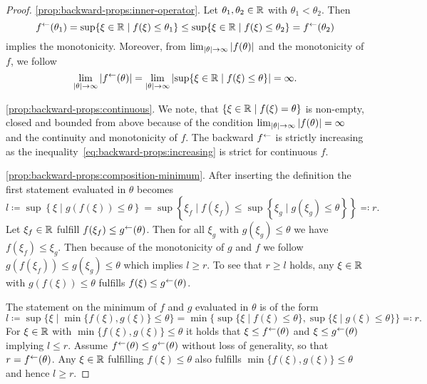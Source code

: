 \begin{proof}
    \ref{prop:backward-props:inner-operator}. 
    Let $\theta_1, \theta_2\in\mathbb{R}$ with $\theta_1 < \theta_2$.
    Then \begin{equation}\label{eq:backward-props:increasing}
        f^{\leftarrow}(\theta_1) = \sup\{\xi\in\mathbb{R} \mid f(\xi) \leq \theta_1 \}
        \leq \sup\{\xi\in\mathbb{R} \mid f(\xi)\leq \theta_2 \} = f^{\leftarrow}(\theta_2)
    \end{equation}
    implies the monotonicity.
    Moreover, from $\lim_{\left| \theta \right|\rightarrow \infty} \left| f(\theta) \right|$ and the monotonicity of $f$, we follow \[
        \lim_{\left| \theta \right|\rightarrow \infty} \left| f^{\leftarrow}(\theta) \right|
        = \lim_{\left| \theta \right|\rightarrow \infty} \left|  \sup\{\xi\in\mathbb{R} \mid f(\xi)\leq \theta \}  \right| = \infty.
    \]

    \ref{prop:backward-props:continuous}.
    We note, that $\{ \xi\in\mathbb{R} \mid f(\xi) = \theta \}$ is non-empty, closed and bounded from above because of the condition $\lim_{\left| \theta \right|\rightarrow \infty} \left| f(\theta) \right| = \infty$ and the continuity and monotonicity of $f$.
    The backward $f^{\leftarrow}$ is strictly increasing as the inequality~\eqref{eq:backward-props:increasing} is strict for continuous $f$.
    
    \ref{prop:backward-props:composition-minimum}.
    After inserting the definition the first statement evaluated in $\theta$ becomes
    \[
        l\coloneqq \sup\left\{
            \xi \mid g(f(\xi)) \leq \theta
        \right\}
        =
        \sup\left\{
            \xi_f \mid f(\xi_f) \leq
            \sup\left\{ \xi_g \mid g(\xi_g) \leq \theta \right\}
            \right\}
         \eqqcolon r.
    \]
    Let $\xi_f\in\mathbb{R}$ fulfill $f(\xi_f) \leq g^{\leftarrow}(\theta)$.
    Then for all $\xi_g$ with $g(\xi_g) \leq \theta$ we have $f(\xi_f) \leq \xi_g$.
    Then because of the monotonicity of $g$ and $f$ we follow $g(f(\xi_f)) \leq g(\xi_g) \leq \theta$ which implies $l \geq r$.
    To see that $r\geq l$ holds, any $\xi\in\mathbb{R}$ with $g(f(\xi)) \leq \theta$ fulfills $f(\xi)\leq g^{\leftarrow}(\theta)$.

    The statement on the minimum of $f$ and $g$ evaluated in $\theta$ is of the form
    \[
        l\coloneqq \sup\{\xi \mid \min\{f(\xi),g(\xi)\} \leq \theta \}
        =
        \min\{
            \sup\{\xi \mid f(\xi)\leq \theta \},
            \sup\{\xi\mid g(\xi)\leq\theta\}
        \} \eqqcolon r.
    \]
    For $\xi\in\mathbb{R}$ with $\min\{f(\xi),g(\xi)\}\leq \theta$ it holds that $\xi\leq f^{\leftarrow}(\theta)$ and $\xi\leq g^{\leftarrow}(\theta)$ implying $l\leq r$.
    Assume $f^{\leftarrow}(\theta)\leq g^{\leftarrow}(\theta)$ without loss of generality, so that $r = f^{\leftarrow}(\theta)$.
    Any $\xi\in\mathbb{R}$ fulfilling $f(\xi)\leq \theta$ also fulfills $\min\{f(\xi),g(\xi)\}\leq \theta$ and hence $l \geq r$.
\end{proof}

